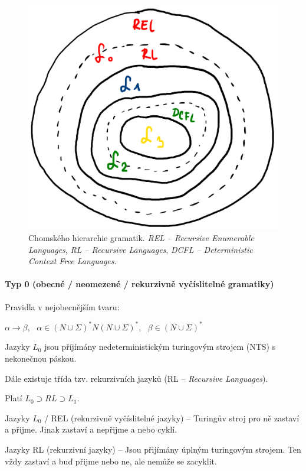 \begin{figure}[H]
    \centering
    \includegraphics[width=0.6\linewidth]{chomsky_hierarchy.pdf}
    \caption{Chomského hierarchie gramatik. \textit{REL -- Recursive Enumerable Languages}, \textit{RL -- Recursive Languages}, \textit{DCFL -- Deterministic Context Free Languages}.}
\end{figure}

\paragraph*{Typ 0 (obecné / neomezené / rekurzivně vyčíslitelné gramatiky)} \begin{compactitem}
    \item Pravidla v nejobecnějším tvaru: \begin{compactitem}
        \item $\alpha \rightarrow \beta,~~~ \alpha \in (N \cup \Sigma)^* N (N \cup \Sigma)^*,~~~ \beta \in (N \cup \Sigma)^*$
    \end{compactitem}

    \item Jazyky $L_0$ jsou příjímány nedeterministickým turingovým strojem (NTS) s nekonečnou páskou.

    \item Dále existuje třída tzv. rekurzivních jazyků (RL -- \textit{Recursive Languages}). \begin{compactitem}
        \item Platí $L_0 \supset RL \supset L_1$.

        \item Jazyky $L_0$ / REL (rekurzivně vyčíslitelné jazyky) -- Turingův stroj pro ně zastaví a přijme. Jinak zastaví a nepřijme a nebo cyklí.

        \item Jazyky RL (rekurzivní jazyky) --
        Jsou přijímány úplným turingovým strojem. Ten vždy zastaví a buď přijme nebo ne, ale nemůže se zacyklit.
    \end{compactitem}
\end{compactitem}

